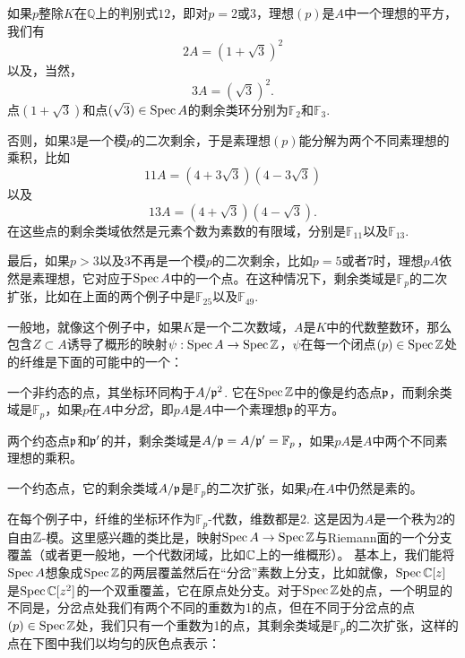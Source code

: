 \begin{compactenum}[(1)]
	\item 如果$p$整除$K$在$\mathbb{Q}$上的判别式$12$，即对$p=2$或$3$，理想$(p)$是$A$中一个理想的平方，我们有
	\[
	2A=(1+\sqrt{3})^2
	\]
	以及，当然，
	\[
	3A=(\sqrt{3})^2.
	\]
	点$(1+\sqrt{3})$和点$(\sqrt{3})\in\operatorname{Spec} A$的剩余类环分别为$\mathbb{F}_2$和$\mathbb{F}_3$.

	\item 否则，如果$3$是一个模$p$的二次剩余，于是素理想$(p)$能分解为两个不同素理想的乘积，比如
	\[
	11A=(4+3\sqrt{3})(4-3\sqrt{3})
	\]
	以及
	\[
	13A=(4+\sqrt{3})(4-\sqrt{3}).
	\]
	在这些点的剩余类域依然是元素个数为素数的有限域，分别是$\mathbb{F}_{11}$以及$\mathbb{F}_{13}$.

	\item 最后，如果$p>3$以及$3$不再是一个模$p$的二次剩余，比如$p=5$或者$7$时，理想$pA$依然是素理想，它对应于$\operatorname{Spec} A$中的一个点。在这种情况下，剩余类域是$\mathbb{F}_p$的二次扩张，比如在上面的两个例子中是$\mathbb{F}_{25}$以及$\mathbb{F}_{49}$.
\end{compactenum}

一般地，就像这个例子中，如果$K$是一个二次数域，$A$是$K$中的代数整数环，那么包含$Z\subset A$诱导了概形的映射$\psi:\operatorname{Spec} A\to \operatorname{Spec} \mathbb{Z}$，$\psi$在每一个闭点$(p)\in \operatorname{Spec} \mathbb{Z}$处的纤维是下面的可能中的一个：

\begin{compactenum}[(1)]
	\item 一个非约态的点，其坐标环同构于$A/\mathfrak{p}^2$. 它在$\operatorname{Spec} \mathbb{Z}$中的像是约态点$\mathfrak{p}$，而剩余类域是$\mathbb{F}_p$，如果$p$在$A$中\textit{分岔}，即$pA$是$A$中一个素理想$\mathfrak{p}$的平方。

	\item 两个约态点$\mathfrak{p}$和$\mathfrak{p}'$的并，剩余类域是$A/\mathfrak{p}=A/\mathfrak{p}'=\mathbb{F}_p$，如果$pA$是$A$中两个不同素理想的乘积。

	\item 一个约态点，它的剩余类域$A/\mathfrak{p}$是$\mathbb{F}_p$的二次扩张，如果$p$在$A$中仍然是素的。
\end{compactenum}

在每个例子中，纤维的坐标环作为$\mathbb{F}_p$\hyp 代数，维数都是2. 这是因为$A$是一个秩为2的自由$\mathbb{Z}$\hyp 模。这里感兴趣的类比是，映射$\operatorname{Spec} A\to \operatorname{Spec} \mathbb{Z}$与Riemann面的一个分支覆盖（或者更一般地，一个代数闭域，比如$\mathbb{C}$上的一维概形）。 基本上，我们能将$\operatorname{Spec} A$想象成$\operatorname{Spec} \mathbb{Z}$的两层覆盖然后在“分岔”素数上分支，比如就像，$\operatorname{Spec} \mathbb{C}[z]$是$\operatorname{Spec} \mathbb{C}[z^2]$的一个双重覆盖，它在原点处分支。对于$\operatorname{Spec} \mathbb{Z}$处的点，一个明显的不同是，分岔点处我们有两个不同的重数为1的点，但在不同于分岔点的点$(p)\in \operatorname{Spec} \mathbb{Z}$处，我们只有一个重数为1的点，其剩余类域是$\mathbb{F}_p$的二次扩张，这样的点在下图中我们以均匀的灰色点表示：

